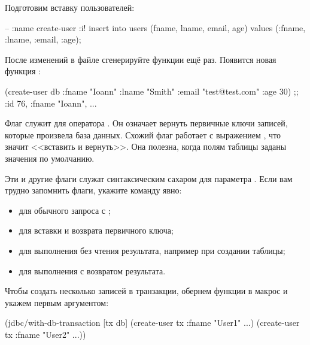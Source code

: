 Подготовим вставку пользователей:

\begin{english}
  \begin{sql}
-- :name create-user :i!
insert into users (fname, lname, email, age)
values (:fname, :lname, :email, :age);
  \end{sql}
\end{english}

После изменений в файле сгенерируйте функции ещё раз. Появится новая функция :

\begin{english}
  \begin{clojure}
(create-user db {:fname "Ioann"
                 :lname "Smith"
                 :email "test@test.com"
                 :age 30})
;; {:id 76, :fname "Ioann", ...}
  \end{clojure}
\end{english}

Флаг  служит для оператора . Он означает вернуть первичные ключи записей, которые произвела база данных. Схожий флаг \code{:<!} работает с выражением , что значит <<вставить и вернуть>>. Она полезна, когда полям таблицы заданы значения по умолчанию.

Эти и другие флаги служат синтаксическим сахаром для параметра . Если вам трудно запомнить флаги, укажите команду явно:

\begin{itemize}

\item
   для обычного запроса с ;

\item
   для вставки и возврата первичного ключа;

\item
   для выполнения без чтения результата, например при создании таблицы;

\item
   для выполнения с возвратом результата.

\end{itemize}

Чтобы создать несколько записей в транзакции, обернем функции в макрос  и укажем  первым аргументом:

\begin{english}
  \begin{clojure}
(jdbc/with-db-transaction [tx db]
  (create-user tx {:fname "User1" ...})
  (create-user tx {:fname "User2" ...}))
  \end{clojure}
\end{english}

